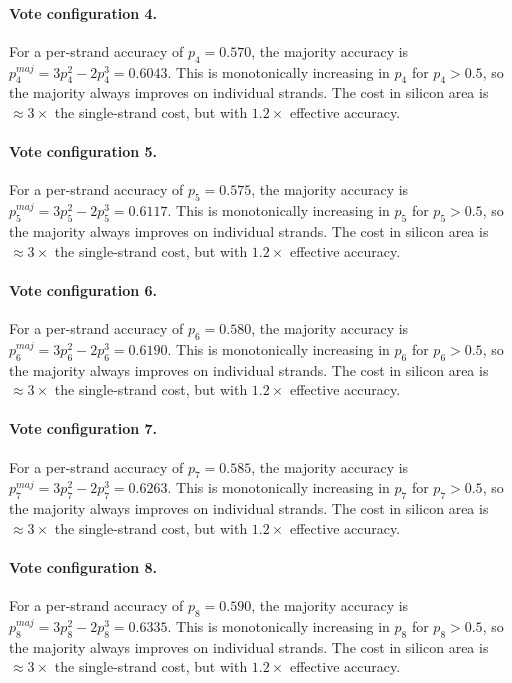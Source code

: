 \paragraph{Vote configuration 4.}
For a per-strand accuracy of $p_{4} = 0.570$, the majority
accuracy is $p_{4}^{maj} = 3p_{4}^2 - 2p_{4}^3 = 0.6043$.
This is monotonically increasing in $p_{4}$ for $p_{4} > 0.5$, so the
majority always improves on individual strands. The cost in silicon area is
$\approx 3\times$ the single-strand cost, but with $1.2\times$ effective accuracy.

\paragraph{Vote configuration 5.}
For a per-strand accuracy of $p_{5} = 0.575$, the majority
accuracy is $p_{5}^{maj} = 3p_{5}^2 - 2p_{5}^3 = 0.6117$.
This is monotonically increasing in $p_{5}$ for $p_{5} > 0.5$, so the
majority always improves on individual strands. The cost in silicon area is
$\approx 3\times$ the single-strand cost, but with $1.2\times$ effective accuracy.

\paragraph{Vote configuration 6.}
For a per-strand accuracy of $p_{6} = 0.580$, the majority
accuracy is $p_{6}^{maj} = 3p_{6}^2 - 2p_{6}^3 = 0.6190$.
This is monotonically increasing in $p_{6}$ for $p_{6} > 0.5$, so the
majority always improves on individual strands. The cost in silicon area is
$\approx 3\times$ the single-strand cost, but with $1.2\times$ effective accuracy.

\paragraph{Vote configuration 7.}
For a per-strand accuracy of $p_{7} = 0.585$, the majority
accuracy is $p_{7}^{maj} = 3p_{7}^2 - 2p_{7}^3 = 0.6263$.
This is monotonically increasing in $p_{7}$ for $p_{7} > 0.5$, so the
majority always improves on individual strands. The cost in silicon area is
$\approx 3\times$ the single-strand cost, but with $1.2\times$ effective accuracy.

\paragraph{Vote configuration 8.}
For a per-strand accuracy of $p_{8} = 0.590$, the majority
accuracy is $p_{8}^{maj} = 3p_{8}^2 - 2p_{8}^3 = 0.6335$.
This is monotonically increasing in $p_{8}$ for $p_{8} > 0.5$, so the
majority always improves on individual strands. The cost in silicon area is
$\approx 3\times$ the single-strand cost, but with $1.2\times$ effective accuracy.

